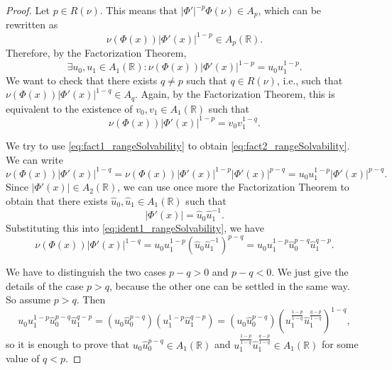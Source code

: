 \documentclass[10pt,a4paper]{amsart}
\newcommand{\R}{\mathbb{R}}
\begin{document}
\begin{proof}
    Let $p\in R(\nu)$. This means that $|\Phi'|^{-p}\Phi(\nu)\in A_p$, which can be rewritten as
    \[
    \nu(\Phi(x))|\Phi'(x)|^{1-p}\in A_p(\R).
    \]
    Therefore, by the Factorization Theorem,  
    \begin{equation}\label{eq:fact1_rangeSolvability}
    \exists u_0,u_1\in A_1(\R): \nu(\Phi(x))|\Phi'(x)|^{1-p}=u_0 u_1^{1-p}.    
    \end{equation}
    We want to check that there exists $q\neq p$ such that $q\in R(\nu)$, i.e., such that $\nu(\Phi(x))|\Phi'(x)|^{1-q}\in A_q$. Again, by the Factorization Theorem, this is equivalent to the existence of $v_0,v_1\in A_1(\R)$ such that
    \begin{equation}\label{eq:fact2_rangeSolvability}
        \nu(\Phi(x))|\Phi'(x)|^{1-p}=v_0 v_1^{1-q}.
    \end{equation}


    We try to use \eqref{eq:fact1_rangeSolvability} to obtain \eqref{eq:fact2_rangeSolvability}. We can write
    \begin{equation}\label{eq:ident1_rangeSolvability}
    \nu(\Phi(x))|\Phi'(x)|^{1-q}
    =
    \nu(\Phi(x))|\Phi'(x)|^{1-p}|\Phi'(x)|^{p-q}
    =
    u_0 u_1^{1-p}|\Phi'(x)|^{p-q}.    
    \end{equation}
    Since $|\Phi'(x)|\in A_2(\R)$, we can use once more the Factorization Theorem to obtain that there exists $\widehat{u}_0,\widehat{u}_1\in A_1(\R)$ such that
    \[
    |\Phi'(x)|
    =
    \widehat{u}_0\widehat{u}_1^{-1}.
    \]
    Substituting this into \eqref{eq:ident1_rangeSolvability}, we have
    \begin{equation}\label{eq:ident2_rangeSolvability}
    \nu(\Phi(x))|\Phi'(x)|^{1-q}
    =
    u_0 u_1^{1-p}(\widehat{u}_0\widehat{u}_1^{-1})^{p-q}
    =
    u_0 u_{1}^{1-p} \widehat{u}_{0}^{p-q} \widehat{u}_{1}^{q-p}.    
    \end{equation}

We have to distinguish the two cases $p-q>0$ and $p-q<0$. We just give the details of the case $p>q$, because the other one can be settled in the same way. So assume $p>q$. Then
    \begin{equation}\label{eq:case1_rangeSolvability}
        u_0 u_1^{1-p} \widehat{u}_{0}^{p-q}\widehat{u}_{1}^{q-p}
        =
        (u_0\widehat{u}_0^{p-q})(u_1^{1-p}\widehat{u}_1^{q-p})
        =
        (u_0\widehat{u}_0^{p-q})(u_1^{\frac{1-p}{1-q}}\widehat{u}_{1}^{\frac{q-p}{1-q}})^{1-q},
    \end{equation}
    so it is enough to prove that $u_0\widehat{u}_0^{p-q}\in A_1(\R)$ and $u_1^{\frac{1-p}{1-q}}\widehat{u}_{1}^{\frac{q-p}{1-q}}\in A_1(\R)$ for some value of $q<p$.


\end{proof}
\end{document}
